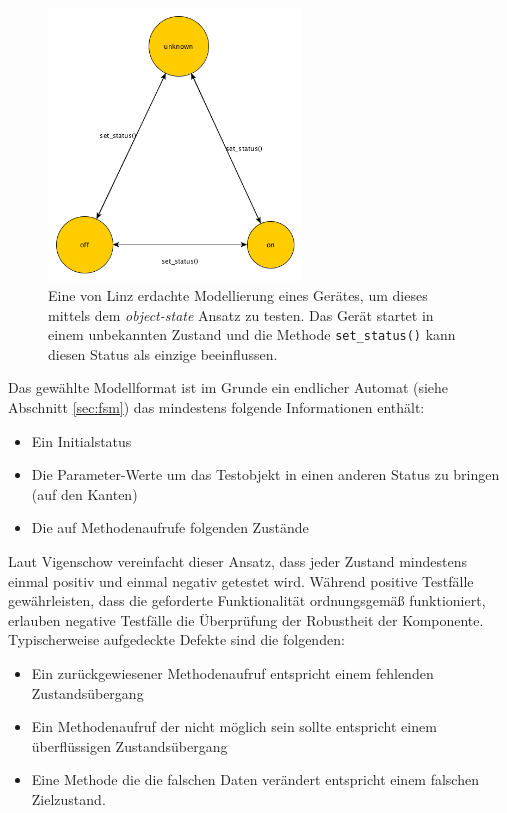 \begin{figure}[h] 
  \centering
     \includegraphics[width=0.6\textwidth]{figures/mbt_unit.png}
  \caption{Eine von Linz\cite{linz_testing_2014} erdachte Modellierung eines Gerätes, um dieses mittels dem \textit{object-state} Ansatz zu testen. Das Gerät startet in einem unbekannten Zustand und die Methode \texttt{set\_status()} kann diesen Status als einzige beeinflussen.}
  \label{fig:mbt_unit}
\end{figure}

Das gewählte Modellformat ist im Grunde ein endlicher Automat (siehe Abschnitt \ref{sec:fsm}) das mindestens folgende Informationen enthält:

\begin{itemize}
\item Ein Initialstatus
\item Die Parameter-Werte um das Testobjekt in einen anderen Status zu bringen (auf den Kanten)
\item Die auf Methodenaufrufe folgenden Zustände
\end{itemize}

Laut Vigenschow\cite{vigenschow_objektorientiertes_2004} vereinfacht dieser Ansatz, dass jeder Zustand mindestens einmal positiv und einmal negativ getestet wird. Während positive Testfälle gewährleisten, dass die geforderte Funktionalität ordnungsgemäß funktioniert, erlauben negative Testfälle die Überprüfung der Robustheit der Komponente. Typischerweise aufgedeckte Defekte sind die folgenden:

\begin{itemize}
\item Ein zurückgewiesener Methodenaufruf entspricht einem fehlenden Zustandsübergang
\item Ein Methodenaufruf der nicht möglich sein sollte entspricht einem überflüssigen Zustandsübergang
\item Eine Methode die die falschen Daten verändert entspricht einem falschen Zielzustand.
\end{itemize}

